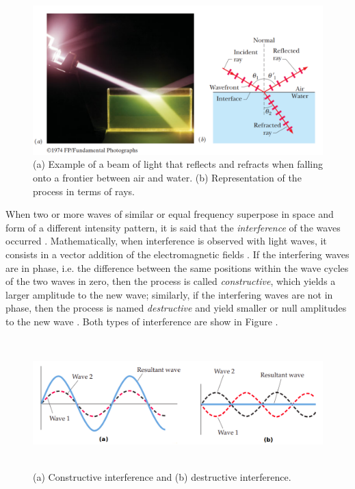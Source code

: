 \begin{figure}[htb]
	\centering
	\caption{\label{fig:beam_split} 
	    (a) Example of a beam of light that reflects and refracts when falling onto a frontier between air and water. (b) Representation of the process in terms of rays.}
	\begin{center}
	    \includegraphics[scale=0.3]{images/fig3.png}
	\end{center}
	\centering
\end{figure}

When two or more waves of similar or equal frequency superpose in space and form of a different intensity pattern, it is said that the \emph{interference} of the waves occurred \cite{tipler2008physics}. Mathematically, when interference is observed with light waves, it consists in a vector addition of the electromagnetic fields \cite{zilio2009optica}.
If the interfering waves are in phase, i.e. the difference between the same positions within the wave cycles of the two waves in zero, then the process is called \emph{constructive}, which yields a larger amplitude to the new wave; similarly, if the interfering waves are not in phase, then the process is named \emph{destructive} and yield smaller or null amplitudes to the new wave \cite{tipler2007physics}. Both types of interference are show in Figure .

\begin{figure}[htb]
	\centering
	\caption{\label{fig:interference} 
	    (a) Constructive interference and (b) destructive interference.}
	\begin{center}
	    \includegraphics[width=\textwidth,height=5cm]{images/interference.png}
	\end{center}
	\centering
\end{figure}

